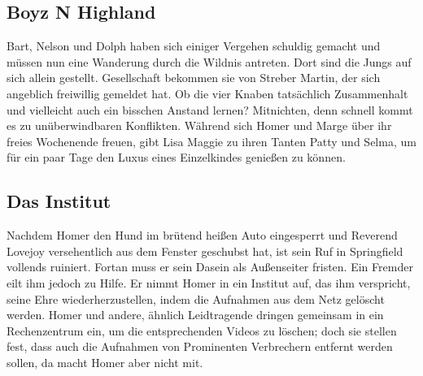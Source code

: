 \subsection{Boyz N Highland}\label{UABF06}
Bart, Nelson und Dolph haben sich einiger Vergehen schuldig gemacht und müssen nun eine Wanderung durch die Wildnis antreten. Dort sind die Jungs auf sich allein gestellt. Gesellschaft bekommen sie von Streber Martin, der sich angeblich freiwillig gemeldet hat. Ob die vier Knaben tatsächlich Zusammenhalt und vielleicht auch ein bisschen Anstand lernen? Mitnichten, denn schnell kommt es zu unüberwindbaren Konflikten. Während sich Homer und Marge über ihr freies Wochenende freuen, gibt Lisa Maggie zu ihren Tanten Patty und Selma, um für ein paar Tage den Luxus eines Einzelkindes genießen zu können.


\subsection{Das Institut}
Nachdem Homer den Hund im brütend heißen Auto eingesperrt und Reverend Lovejoy versehentlich aus dem Fenster geschubst hat, ist sein Ruf in Springfield vollends ruiniert. Fortan muss er sein Dasein als Außenseiter fristen. Ein Fremder eilt ihm jedoch zu Hilfe. Er nimmt Homer in ein Institut auf, das ihm verspricht, seine Ehre wiederherzustellen, indem die Aufnahmen aus dem Netz gelöscht werden. Homer und andere, ähnlich Leidtragende dringen gemeinsam in ein Rechenzentrum ein, um die entsprechenden Videos zu löschen; doch sie stellen fest, dass auch die Aufnahmen von Prominenten Verbrechern entfernt werden sollen, da macht Homer aber nicht mit. 


